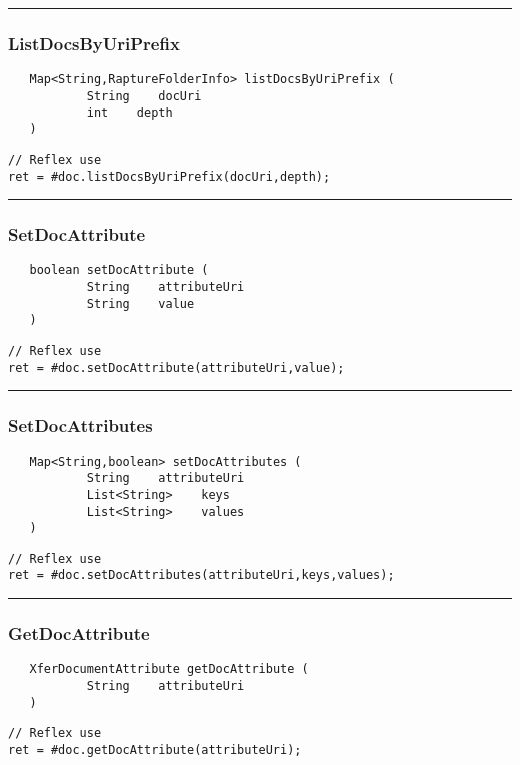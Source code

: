 \rule{15cm}{2pt}
\subsubsection{ListDocsByUriPrefix}
\label{Api:ListDocsByUriPrefix}
\begin{verbatim}
   Map<String,RaptureFolderInfo> listDocsByUriPrefix (
           String    docUri
           int    depth
   )
\end{verbatim}
\begin{lstlisting}[language=reflex]
// Reflex use
ret = #doc.listDocsByUriPrefix(docUri,depth);
\end{lstlisting}



\rule{15cm}{2pt}
\subsubsection{SetDocAttribute}
\label{Api:SetDocAttribute}
\begin{verbatim}
   boolean setDocAttribute (
           String    attributeUri
           String    value
   )
\end{verbatim}
\begin{lstlisting}[language=reflex]
// Reflex use
ret = #doc.setDocAttribute(attributeUri,value);
\end{lstlisting}



\rule{15cm}{2pt}
\subsubsection{SetDocAttributes}
\label{Api:SetDocAttributes}
\begin{verbatim}
   Map<String,boolean> setDocAttributes (
           String    attributeUri
           List<String>    keys
           List<String>    values
   )
\end{verbatim}
\begin{lstlisting}[language=reflex]
// Reflex use
ret = #doc.setDocAttributes(attributeUri,keys,values);
\end{lstlisting}



\rule{15cm}{2pt}
\subsubsection{GetDocAttribute}
\label{Api:GetDocAttribute}
\begin{verbatim}
   XferDocumentAttribute getDocAttribute (
           String    attributeUri
   )
\end{verbatim}
\begin{lstlisting}[language=reflex]
// Reflex use
ret = #doc.getDocAttribute(attributeUri);
\end{lstlisting}



